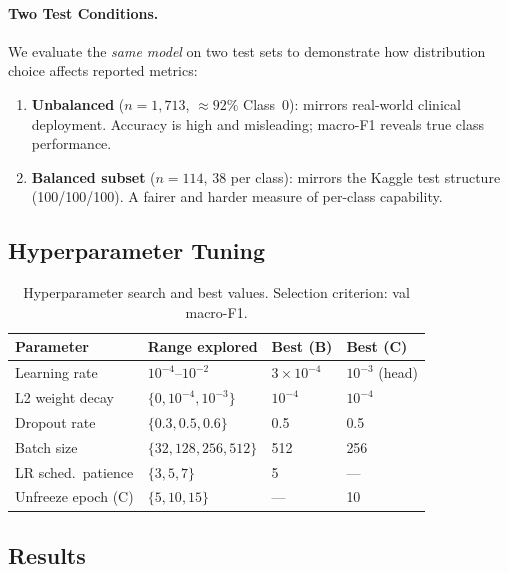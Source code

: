 \documentclass[11pt, letterpaper]{article}
\begin{document}
\paragraph{Two Test Conditions.}
We evaluate the \emph{same model} on two test sets to demonstrate how
distribution choice affects reported metrics:
\begin{enumerate}
  \item \textbf{Unbalanced} ($n = 1{,}713$, ${\approx}92\%$ Class~0):
    mirrors real-world clinical deployment.
    Accuracy is high and misleading; macro-F1 reveals true class performance.
  \item \textbf{Balanced subset} ($n = 114$, 38 per class):
    mirrors the Kaggle test structure (100/100/100).
    A fairer and harder measure of per-class capability.
\end{enumerate}

\subsection{Hyperparameter Tuning}
\label{subsec:hptuning}

\begin{table}[H]
  \centering
  \caption{Hyperparameter search and best values. Selection criterion: val macro-F1.}
  \begin{tabular}{llll}
    \toprule
    \textbf{Parameter} & \textbf{Range explored} & \textbf{Best (B)} & \textbf{Best (C)} \\
    \midrule
    Learning rate       & $10^{-4}$--$10^{-2}$ & $3\times10^{-4}$ & $10^{-3}$ (head) \\
    L2 weight decay     & $\{0, 10^{-4}, 10^{-3}\}$ & $10^{-4}$ & $10^{-4}$ \\
    Dropout rate        & $\{0.3, 0.5, 0.6\}$ & 0.5 & 0.5 \\
    Batch size          & $\{32, 128, 256, 512\}$ & 512 & 256 \\
    LR sched.\ patience & $\{3, 5, 7\}$ & 5 & --- \\
    Unfreeze epoch (C)  & $\{5, 10, 15\}$ & --- & 10 \\
    \bottomrule
  \end{tabular}
\end{table}

\subsection{Results}
\label{subsec:results}
\end{document}
